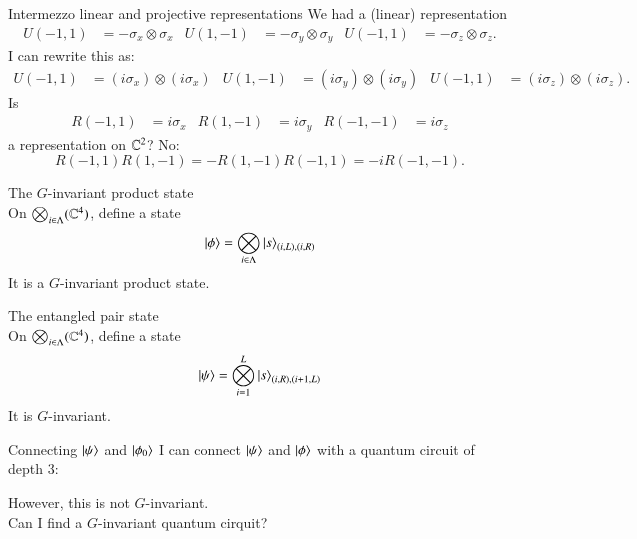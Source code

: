 \documentclass{beamer}
\begin{document}
\begin{frame}{Intermezzo linear and projective representations}
	We had a (linear) representation
	\begin{align*}
			U(-1,1)&=-\sigma_x\otimes \sigma_x&U(1,-1)&=-\sigma_y\otimes \sigma_y&U(-1,1)&=-\sigma_z\otimes \sigma_z.
	\end{align*}
	\pause
	I can rewrite this as:\\
	\begin{align*}
	U(-1,1)&=(i\sigma_x)\otimes (i\sigma_x)&U(1,-1)&=(i\sigma_y)\otimes (i\sigma_y)&U(-1,1)&=(i\sigma_z)\otimes (i\sigma_z).
	\end{align*}
	\pause
	Is
	\begin{align*}
		R(-1,1)&=i\sigma_x&R(1,-1)&=i\sigma_y&R(-1,-1)&=i\sigma_z
	\end{align*}
	 a representation on $\mathbb{C}^2$? \pause No:
	\begin{equation*}
		R(-1,1)R(1,-1)=-R(1,-1)R(-1,1)=-i R(-1,-1).
	\end{equation*}
\end{frame}

\begin{frame}{The $G$-invariant product state}
	\\
	On $\bigotimes_{i\in\Lambda}(\mathbb{C}^4)$, define a state
	\begin{equation*}
		\ket{\phi}=\bigotimes_{i\in\Lambda}\ket{s}_{(i,L),(i,R)}
	\end{equation*}
	\pause
	It is a $G$-invariant product state.
\end{frame}

\begin{frame}{The entangled pair state}
	\\
	On $\bigotimes_{i\in\Lambda}(\mathbb{C}^4)$, define a state
	\begin{equation*}
		\ket{\psi}=\bigotimes_{i=1}^L\ket{s}_{(i,R),(i+1,L)}
	\end{equation*}
	\pause
	It is $G$-invariant.
\end{frame}


\begin{frame}{Connecting $\ket{\psi}$ and $\ket{\phi_0}$}
	I can connect $\ket{\psi}$ and $\ket{\phi}$ with a quantum circuit of depth 3:
	\begin{center}
		\scalebox{0.75}{
		
		}
	\end{center}
	\pause
	However, this is not $G$-invariant.\\
	\pause
	Can I find a $G$-invariant quantum cirquit?
\end{frame}
\end{document}
